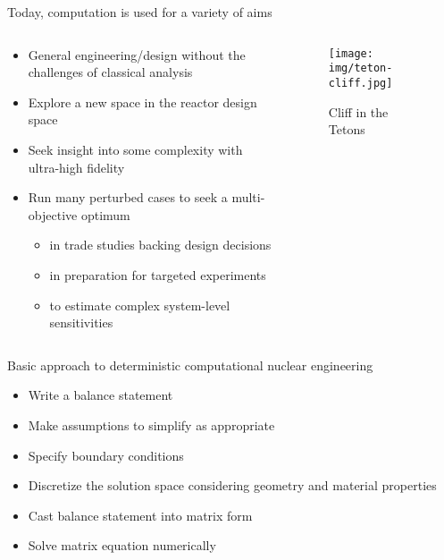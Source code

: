 \documentclass[pdf,aspectratio=169]{beamer}
\begin{document}
\begin{frame}{Today, computation is used for a variety of aims}
\begin{columns}
    \begin{column}{0.7\textwidth}
        \begin{itemize}
            \item General engineering/design without the challenges of classical analysis
            \item Explore a new space in the reactor design space
            \item Seek insight into some complexity with ultra-high fidelity
            \item Run many perturbed cases to seek a multi-objective optimum
            \begin{itemize}
                \item in trade studies backing design decisions
                \item in preparation for targeted experiments 
                \item to estimate complex system-level sensitivities
            \end{itemize}
        \end{itemize}
    \end{column}
    \begin{column}{0.3\textwidth}
        \begin{figure}[ht]
        \centering
        \texttt{[image: img/teton-cliff.jpg]}
            \caption{\tiny Cliff in the Tetons}
        \end{figure}
    \end{column}
\end{columns}
\end{frame}

\begin{frame}{Basic approach to deterministic computational nuclear engineering}
    \begin{itemize}
        \item Write a balance statement
        \item Make assumptions to simplify as appropriate
        \item Specify boundary conditions
        \item Discretize the solution space considering geometry and material properties
        \item Cast balance statement into matrix form
        \item Solve matrix equation numerically
    \end{itemize}

\end{frame}
\end{document}
